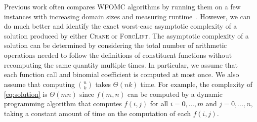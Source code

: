 \documentclass{article}
\theoremstyle{definition}
\begin{document}

Previous work often compares WFOMC algorithms by running them on a few instances
with increasing domain sizes and measuring
runtime~\cite{DBLP:conf/nips/Broeck11,DBLP:conf/ijcai/BroeckTMDR11,DBLP:conf/aaai/BroeckD12}.
However, we can do much better and identify the exact worst-case asymptotic
complexity of a solution produced by either \textsc{Crane} or \textsc{ForcLift}.
The asymptotic complexity of a solution can be determined by considering the
total number of arithmetic operations needed to follow the definitions of
constituent functions without recomputing the same quantity multiple times. In
particular, we assume that each function call and binomial coefficient is
computed at most once. We also assume that computing $\binom{n}{k}$ takes
$\Theta(nk)$ time. For example, the complexity of \cref{eq:solution} is
$\Theta(mn)$ since $f(m, n)$ can be computed by a dynamic programming algorithm
that computes $f(i, j)$ for all $i = 0, \dots, m$ and $j = 0, \dots, n$, taking
a constant amount of time on the computation of each $f(i, j)$.
\end{document}
